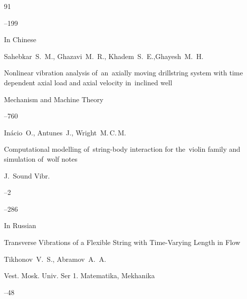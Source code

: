 \begin{thebibliography}{91}


--199

\lang In  Chinese







\by Sahebkar~S.~M., Ghazavi~M.~R., Khadem~S.~E.,Ghayesh~M.~H.

\paper Nonlinear vibration analysis of~an~axially moving drillstring system with time dependent axial load and axial velocity in~inclined well

\jour Mechanism and Machine Theory




--760





\by In\'acio~O., Antunes~J., Wright~M.\,C.\,M.

\paper Computational modelling of~string-body interaction for the~violin family and simulation of~wolf notes

\jour J.~Sound Vibr.


--2


--286







\lang In Russian

\paper Transverse Vibrations of a Flexible String with Time-Varying Length in Flow   

\by Tikhonov~V.~S., Abramov~A.~A.  


\jour Vest. Mosk. Univ. Ser 1. Matematika, Mekhanika


--48









\end{thebibliography}

